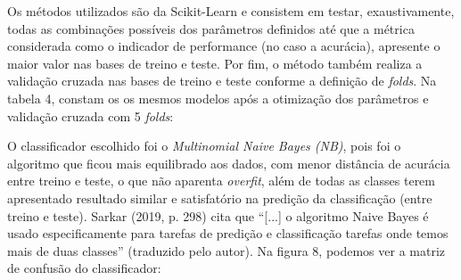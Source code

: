 \documentclass[twocolumn]{rbef}
\newcommand{\1}{\mathbbm{1}}
\begin{document}
\newline\linebreak Os métodos utilizados são da Scikit-Learn e consistem em testar, exaustivamente, todas as combinações possíveis dos parâmetros definidos até que a métrica considerada como o indicador de performance (no caso a acurácia), apresente o maior valor nas bases de treino e teste. Por fim, o método também realiza a validação cruzada nas bases de treino e teste conforme a definição de \emph{folds}. Na tabela 4, constam os os mesmos modelos após a otimização dos parâmetros e validação cruzada com 5 \emph{folds}:
\begin{table}[!htb]
\caption{Classificadores: hiperparâmetros otimizados}
\end{table}
\newline\linebreak O classificador escolhido foi o \emph{Multinomial Naive Bayes (NB)}, pois foi o algoritmo que ficou mais equilibrado aos dados, com menor distância de acurácia entre treino e teste, o que não aparenta \emph{overfit}, além de todas as classes terem apresentado resultado similar e satisfatório na predição da classificação (entre treino e teste). Sarkar (2019, p. 298)\cite{SARKAR} cita que “[...] o algoritmo Naive Bayes é usado especificamente para tarefas de predição e classificação tarefas onde temos mais de duas classes” (traduzido pelo autor).  Na figura 8, podemos ver a matriz de confusão do classificador:
\end{document}
